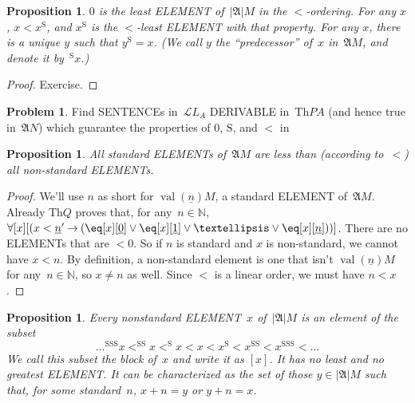 \documentclass[10pt,a4paper]{article}
\makeatletter
\newcommand*{\olup}[1]{\MakeUppercase{#1}}
\theoremstyle{plain}
\newtheorem{prop}[thm]{Proposition}
\theoremstyle{definition}
\newtheorem{prob}{Problem}[section]
\theoremstyle{remark}
\newcommand*{\ollabel}[1]{\label{#1}}
\newcommand{\olref}{\@ifnextchar[{\olref@i}{\olref@final}}
\def\olref@i[#1]{\@ifnextchar[{\olref@ii}{\olref@final}}
\def\olref@ii[#1]{\@ifnextchar[{\olref@iii}{\olref@final}}
\def\olref@iii[#1]{\olref@final}
\def\olref@final#1{\ref{#1}}
\providecommand{\lif}{\mathbin{\rightarrow}}
\providecommand{\lforall}{\mathord{\forall}}
\providecommand{\Struct}{\ensuremath{\mathfrak{A}}}
\providecommand{\Domain}{\ensuremath{|\mathfrak{A}|}}
\providecommand{\Lang}{\ensuremath{\mathcal{L}}}
\providecommand{\Th}{\ensuremath{\mathrm{Th}}}
\providecommand{\num}[1]{\underline{#1}}
\providecommand{\Nat}{\ensuremath{\mathbb{N}}}
\providecommand{\Value}[1]{\operatorname{val}(#1)}
\providecommand{\nszero}{\mathrm{0}}
\providecommand{\nssucc}{\mathrm{S}}
\providecommand{\nsplus}{\mathbin{+}}
\providecommand{\nsless}{<}
\makeatother
\begin{document}
\begin{prop}
\ollabel{prop:M-discrete} $\nszero$ is the least \olup{element}
of~$\Domain{M}$ in the $\nsless$-ordering. For any $x$, $x \nsless
x^\nssucc$, and $x^\nssucc$ is the $\nsless$-least \olup{element} with
that property.  For any $x$, there is a unique $y$ such that
$y^\nssucc = x$. (We call $y$ the ``predecessor'' of~$x$
in~$\Struct{M}$, and denote it by~$^\nssucc x$.)
\end{prop}

\begin{proof}
Exercise.  
\end{proof}

\begin{prob}
Find \olup{sentence}s in~$\Lang{L_A}$ \olup{derivable} in~$\Th{PA}$ (and
hence true in~$\Struct{N}$) which guarantee the properties of
$\nszero$, $\nssucc$, and $\nsless$ in
\olref[mod][mar][mpa]{prop:M-discrete}
\end{prob}

\begin{prop}
All standard \olup{element}s of~$\Struct{M}$ are less than (according
to~$\nsless$) all non-standard \olup{element}s.
\end{prop}

\begin{proof}
We'll use $n$ as short for $\Value{\num{n}}{M}$, a standard
\olup{element} of~$\Struct{M}$.  Already $\Th{Q}$ proves that, for any~$n
\in \Nat$, $\lforall[x][(x < \num{n}' \lif (\eq[x][\num{0}] \lor
  \eq[x][\num{1}] \lor \dots \lor \eq[x][\num{n}]))]$. There are no
\olup{element}s that are $\nsless \nszero$. So if $n$ is standard and $x$
is non-standard, we cannot have $x \nsless n$. By definition, a
non-standard element is one that isn't $\Value{\num{n}}{M}$ for any~$n
\in \Nat$, so $x \neq n$ as well. Since $\nsless$ is a linear order,
we must have $n \nsless x$.
\end{proof}

\begin{prop}
Every nonstandard \olup{element}~$x$ of~$\Domain{M}$ is an element of the subset
\[
\dots ^{\nssucc\nssucc\nssucc}x \nsless ^{\nssucc\nssucc}x \nsless
^{\nssucc}x \nsless x \nsless x^{\nssucc} \nsless x^{\nssucc\nssucc}
\nsless x^{\nssucc\nssucc\nssucc} \nsless \dots
\]
We call this subset the \emph{block of~$x$} and write it as $[x]$. It
has no least and no greatest \olup{element}. It can be characterized as
the set of those $y \in \Domain{M}$ such that, for some standard~$n$,
$x \nsplus n = y$ or $y \nsplus n = x$.
\end{prop}
\end{document}
